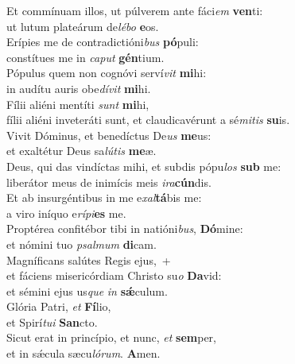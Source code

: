 \evenverse Et commínuam illos, ut púlverem ante fáci\textit{em} \textbf{ven}ti:~\*\\
\evenverse ut lutum plateárum de\textit{lé}\textit{bo} \textbf{e}os.\\
\oddverse Erípies me de contradictióni\textit{bus} \textbf{pó}puli:~\*\\
\oddverse constítues me in \textit{ca}\textit{put} \textbf{gén}tium.\\
\evenverse Pópulus quem non cognóvi serví\textit{vit} \textbf{mi}hi:~\*\\
\evenverse in audítu auris obe\textit{dí}\textit{vit} \textbf{mi}hi.\\
\oddverse Fílii aliéni mentíti \textit{sunt} \textbf{mi}hi,~\*\\
\oddverse fílii aliéni inveteráti sunt, et claudicavérunt a sé\textit{mi}\textit{tis} \textbf{su}is.\\
\evenverse Vivit Dóminus, et benedíctus De\textit{us} \textbf{me}us:~\*\\
\evenverse et exaltétur Deus sa\textit{lú}\textit{tis} \textbf{me}æ.\\
\oddverse Deus, qui das vindíctas mihi, et subdis pópu\textit{los} \textbf{sub} me:~\*\\
\oddverse liberátor meus de inimícis meis \textit{i}\textit{ra}\textbf{cún}dis.\\
\evenverse Et ab insurgéntibus in me e\textit{xal}\textbf{tá}bis me:~\*\\
\evenverse a viro iníquo e\textit{rí}\textit{pi}\textbf{es} me.\\
\oddverse Proptérea confitébor tibi in natióni\textit{bus}, \textbf{Dó}mine:~\*\\
\oddverse et nómini tuo \textit{psal}\textit{mum} \textbf{di}cam.\\
\evenverse Magníficans salútes Regis ejus,~+\\
\evenverse  et fáciens misericórdiam Christo su\textit{o} \textbf{Da}vid:~\*\\
\evenverse et sémini ejus us\textit{que} \textit{in} \textbf{sǽ}culum.\\
\oddverse Glória Patri, \textit{et} \textbf{Fí}lio,~\*\\
\oddverse et Spirí\textit{tu}\textit{i} \textbf{San}cto.\\
\evenverse Sicut erat in princípio, et nunc, \textit{et} \textbf{sem}per,~\*\\
\evenverse et in sǽcula sæcu\textit{ló}\textit{rum}. \textbf{A}men.\\
